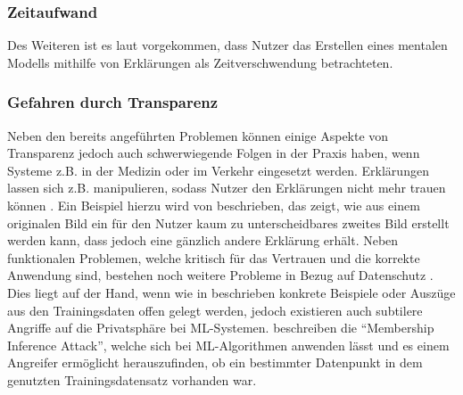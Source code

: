 \subsubsection{Zeitaufwand}
Des Weiteren ist es laut \cite{vaughan2020human} vorgekommen, dass Nutzer das Erstellen eines mentalen Modells mithilfe von Erklärungen als Zeitverschwendung betrachteten. 

\subsubsection{Gefahren durch Transparenz}
Neben den bereits angeführten Problemen können einige Aspekte von Transparenz jedoch auch schwerwiegende Folgen in der Praxis haben, wenn Systeme z.B. in der Medizin oder im Verkehr eingesetzt werden. 
Erklärungen lassen sich z.B. manipulieren, sodass Nutzer den Erklärungen nicht mehr trauen können \cite{tjoa2020survey}. Ein Beispiel hierzu wird von \cite{ghorbani2019interpretation} beschrieben, das zeigt, wie aus einem originalen Bild ein für den Nutzer kaum zu unterscheidbares zweites Bild erstellt werden kann, dass jedoch eine gänzlich andere Erklärung erhält.
Neben funktionalen Problemen, welche kritisch für das Vertrauen und die korrekte Anwendung sind, bestehen noch weitere Probleme in Bezug auf Datenschutz \cite{de2018algorithmic}. Dies liegt auf der Hand, wenn wie in  beschrieben konkrete Beispiele oder Auszüge aus den Trainingsdaten offen gelegt werden, jedoch existieren auch subtilere Angriffe auf die Privatsphäre bei ML-Systemen. \cite{shokri2017membership} beschreiben die \enquote{Membership Inference Attack}, welche sich bei ML-Algorithmen anwenden lässt und es einem Angreifer ermöglicht herauszufinden, ob ein bestimmter Datenpunkt in dem genutzten Trainingsdatensatz vorhanden war.